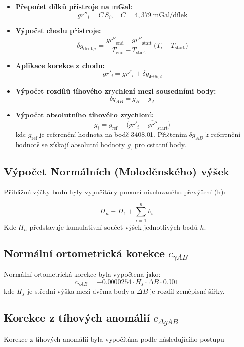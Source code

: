 \begin{itemize}
  \item \textbf{Přepočet dílků přístroje na mGal:}
    \[
      gr''_i = C\,S_i,
      \quad C = 4{,}379\;\text{mGal/dílek}
    \]
  \item \textbf{Výpočet chodu přístroje:}
    \[
      \delta g_{\mathrm{drift},i}
        = \frac{\overline{gr''}_{\mathrm{end}} - \overline{gr''}_{\mathrm{start}}}
               {T_{\mathrm{end}} - T_{\mathrm{start}}}
          \,\bigl(T_i - T_{\mathrm{start}}\bigr)
    \]
  \item \textbf{Aplikace korekce z chodu:}
    \[
      gr'_i = gr''_i + \delta g_{\mathrm{drift},i}
    \]
  \item \textbf{Výpočet rozdílů tíhového zrychlení mezi sousedními body:}
    \[
      \delta g_{AB} = g_B - g_A
    \]
  \item \textbf{Výpočet absolutního tíhového zrychlení:}
    \[
      g_i = g_{\mathrm{ref}}
          + \bigl(gr'_i - \overline{gr''}_{\mathrm{start}}\bigr)
    \]
    kde \(g_{\mathrm{ref}}\) je referenční hodnota na bodě 3408.01. Přičtením \(\delta g_{AB}\) k referenční hodnotě se získají absolutní hodnoty \(g_i\) pro ostatní body.
\end{itemize}


\subsection{Výpočet Normálních (Moloděnského) výšek}

Přibližné výšky bodů byly vypočítány pomocí nivelovaného převýšení (h):

\[
H_n = H_1+\sum_{i=1}^n h_i
\]
Kde \( H_n \) představuje kumulativní součet výšek jednotlivých bodů \( h \).
\subsection*{Normální ortometrická korekce \( c_{\gamma AB} \)}
Normální ortometrická korekce byla vypočtena jako: 
\[
c_{\gamma AB} = -0.0000254 \cdot H_s \cdot \Delta B \cdot 0.001
\]
kde \(H_s\) je střední výška mezi dvěma body a \(\Delta B\) je rozdíl zeměpisné šířky.
\subsection*{Korekce z tíhových anomálií \( c_{\Delta g AB} \)}
Korekce z tíhových anomálií byla vypočítána podle následujícího postupu:

